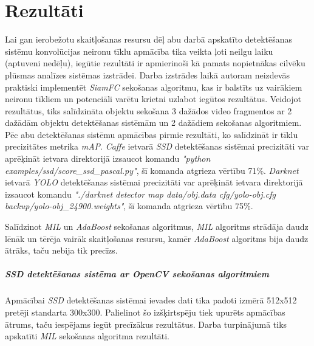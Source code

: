 \chapter{Rezultāti}

Lai gan ierobežotu skaitļošanas resursu dēļ abu darbā apskatīto detektēšanas sistēmu konvolūcijas neironu tīklu apmācība tika veikta ļoti neilgu laiku (aptuveni nedēļu), iegūtie rezultāti ir apmierinoši kā pamats nopietnākas cilvēku plūsmas analīzes sistēmas izstrādei. Darba izstrādes laikā autoram neizdevās praktiski implementēt \textit{SiamFC} sekošanas algoritmu, kas ir balstīts uz vairākiem neironu tīkliem un potenciāli varētu krietni uzlabot iegūtos rezultātus. Veidojot rezultātus, tiks salīdzināta objektu sekošana 3 dažādos video fragmentos ar 2 dažādām objektu detektēšanas sistēmām un 2 dažādiem sekošanas algoritmiem. Pēc abu detektēšanas sistēmu apmācības pirmie rezultāti, ko salīdzināt ir tīklu precizitātes metrika \textit{mAP}. \textit{Caffe} ietvarā \textit{SSD} detektēšanas sistēmai precizitāti var aprēķināt ietvara direktorijā izsaucot komandu \textit{"python examples/ssd/score_ssd_pascal.py"}, šī komanda atgrieza vērtību 71\%. \textit{Darknet} ietvarā \textit{YOLO} detektēšanas sistēmai precizitāti var aprēķināt ietvara direktorijā izsaucot komandu\textit{ "./darknet detector map data/obj.data cfg/yolo-obj.cfg backup/yolo-obj_24900.weights"}, šī komanda atgrieza vērtību 75\%. 

Salīdzinot \textit{MIL} un \textit{AdaBoost} sekošanas algoritmus, \textit{MIL} algoritms strādāja daudz lēnāk un tērēja vairāk skaitļošanas resursu, kamēr \textit{AdaBoost} algoritms bija daudz ātrāks, taču nebija tik precīzs.

\paragraph{\textit{SSD} detektēšanas sistēma ar \textit{OpenCV} sekošanas algoritmiem}
\hfill\par

Apmācībai \textit{SSD} detektēšanas sistēmai ievades dati tika padoti izmērā 512x512 pretēji standarta 300x300. Palielinot šo izšķirtspēju tiek upurēts apmācības ātrums, taču iespējams iegūt precīzākus rezultātus. Darba turpinājumā tiks apskatīti \textit{MIL} sekošanas algoritma rezultāti. 
 

